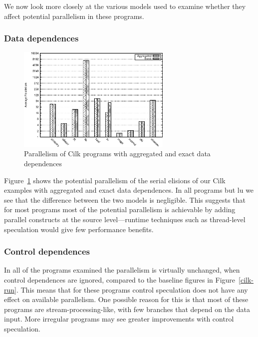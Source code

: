 We now look more closely at the various models used to examine whether they affect potential parallelism in these programs.

\subsubsection{Data dependences}

\begin{figure}
 \centering
 \includegraphics[width=2.9in]{cilk-data}
 \caption{Parallelism of Cilk programs with aggregated and exact data dependences}
 \label{cilk-data}
\end{figure}

Figure~\ref{cilk-data} shows the potential parallelism of the serial elisions of our Cilk examples with aggregated and exact data dependences.
In all programs but \textsf{lu} we see that the difference between the two models is negligible.
This suggests that for most programs most of the potential parallelism is achievable by adding parallel constructs at the source level---runtime techniques such as thread-level speculation would give few performance benefits.

\subsubsection{Control dependences}


In all of the programs examined the parallelism is virtually unchanged, when control dependences are ignored, compared to the baseline figures in Figure~\ref{cilk-run}.
This means that for these programs control speculation does not have any effect on available parallelism.
One possible reason for this is that most of these programs are stream-processing-like, with few branches that depend on the data input.
More irregular programs may see greater improvements with control speculation.

